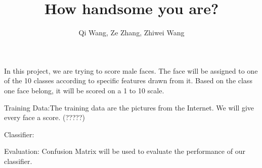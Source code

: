 \documentclass{article}
\title{How handsome you are?}
\author{Qi Wang, Ze Zhang, Zhiwei Wang}
\begin{document}
	\maketitle
	In this project, we are trying to score male faces. The face will be assigned to one of the 10 classes according to specific features drawn from it. Based on the class one face belong, it will be scored on a 1 to 10 scale. \par

	Training Data:The training data are the pictures from the Internet. We will give every face a score. (?????) \par
	
	Classifier: \par
	
	Evaluation: Confusion Matrix will be used to evaluate the performance of our classifier.\par
	
\end{document}
